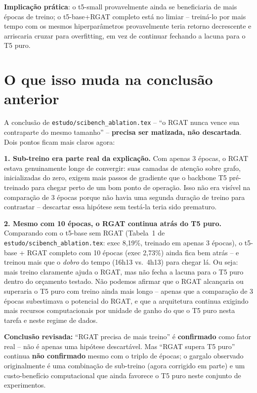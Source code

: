 \documentclass{article}
\begin{document}
\textbf{Implicação prática}: o t5-small provavelmente ainda se
beneficiaria de mais épocas de treino; o t5-base+RGAT completo está no
limiar -- treiná-lo por mais tempo com os mesmos hiperparâmetros
provavelmente teria retorno decrescente e arriscaria cruzar para
overfitting, em vez de continuar fechando a lacuna para o T5 puro.

\section{O que isso muda na conclusão anterior}

A conclusão de \texttt{estudo/scibench\_ablation.tex} -- ``o RGAT nunca
vence sua contraparte do mesmo tamanho'' -- \textbf{precisa ser
matizada, não descartada}. Dois pontos ficam mais claros agora:

\textbf{1. Sub-treino era parte real da explicação.} Com apenas 3
épocas, o RGAT estava genuinamente longe de convergir: suas camadas de
atenção sobre grafo, inicializadas do zero, exigem mais passos de
gradiente que o backbone T5 pré-treinado para chegar perto de um bom
ponto de operação. Isso não era visível na comparação de 3 épocas
porque não havia uma segunda duração de treino para contrastar --
descartar essa hipótese sem testá-la teria sido prematuro.

\textbf{2. Mesmo com 10 épocas, o RGAT continua atrás do T5 puro.}
Comparando com o t5-base sem RGAT (Tabela~1 de
\texttt{estudo/scibench\_ablation.tex}: exec 8,19\%, treinado em
apenas 3 épocas), o t5-base + RGAT completo com 10 épocas
(exec 2,73\%) ainda fica bem atrás -- e treinou mais que o
\emph{dobro} do tempo (16h13 vs.\ 4h13) para chegar lá. Ou seja: mais
treino claramente ajuda o RGAT, mas não fecha a lacuna para o T5 puro
dentro do orçamento testado. Não podemos afirmar que o RGAT alcançaria
ou superaria o T5 puro com treino ainda mais longo -- apenas que a
comparação de 3 épocas subestimava o potencial do RGAT, e que a
arquitetura continua exigindo mais recursos computacionais por unidade
de ganho do que o T5 puro nesta tarefa e neste regime de dados.

\textbf{Conclusão revisada:} ``RGAT precisa de mais treino'' é
\textbf{confirmado} como fator real -- não é apenas uma hipótese
descartável. Mas ``RGAT supera T5 puro'' continua \textbf{não
confirmado} mesmo com o triplo de épocas; o gargalo observado
originalmente é uma combinação de sub-treino (agora corrigido em
parte) e um custo-benefício computacional que ainda favorece o T5 puro
neste conjunto de experimentos.
\end{document}
